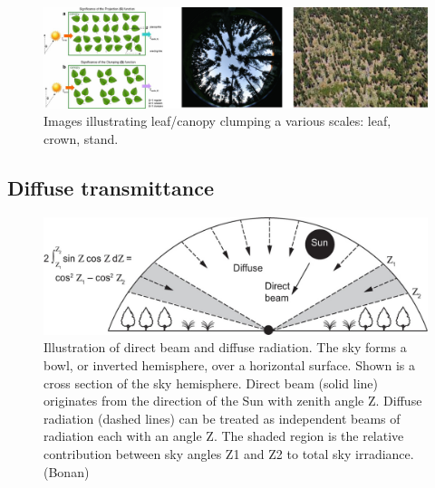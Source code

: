 \documentclass[12pt,oneside]{book}
\begin{document}
\begin{figure}

{\centering \includegraphics[width=0.8\linewidth]{figures/chap3/f315_clumping} 

}

\caption{Images illustrating leaf/canopy clumping a various scales: leaf, crown, stand.}\label{fig:f315}
\end{figure}

\subsection{Diffuse transmittance}\label{diffuse-transmittance}

\begin{figure}

{\centering \includegraphics[width=0.8\linewidth]{figures/chap3/f316_diffuse} 

}

\caption{Illustration of direct beam and diffuse radiation. The sky forms a bowl, or inverted hemisphere, over a horizontal surface. Shown is a cross section of the sky hemisphere. Direct beam (solid line) originates from the    direction of the Sun with zenith angle Ζ. Diffuse radiation (dashed lines) can be treated as independent beams of radiation each with an angle Ζ. The shaded region is the relative contribution between sky angles Ζ1 and Ζ2 to total sky irradiance.(Bonan)}\label{fig:f316}
\end{figure}
\end{document}
